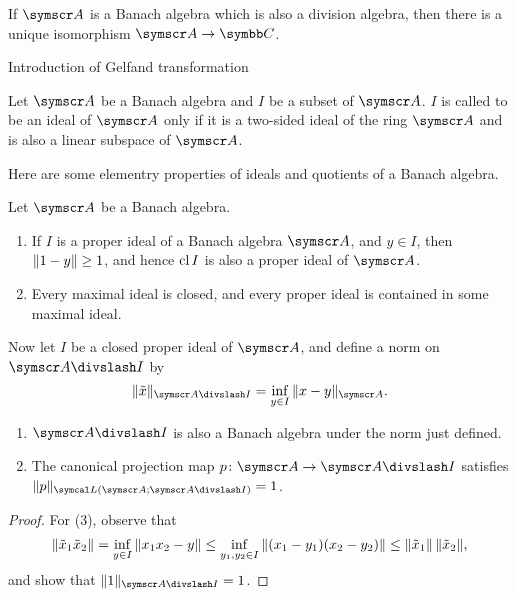 \begin{theorem}
  If $\BA A$ is a Banach algebra which is also a division algebra, then there is a unique isomorphism $\BA A\to \CC$.
\end{theorem}

Introduction of Gelfand transformation

\begin{definition}
  Let $\BA A$ be a Banach algebra and $I$ be a subset of $\BA A$. $I$ is called to be an ideal of $\BA A$ only if it is a two-sided ideal of the ring $\BA A$ and is also a linear subspace of $\BA A$.
\end{definition}

Here are some elementry properties of ideals and quotients of a Banach algebra.

\begin{proposition}
  Let $\BA A$ be a Banach algebra.
  \begin{enumerate}
    \item If $I$ is a proper ideal of a Banach algebra $\BA A$, and $y\in I$, then $\Vert1-y\Vert\geq 1$, and hence $\operatorname{cl} I$ is also a proper ideal of $\BA A$.
    \item Every maximal ideal is closed, and every proper ideal is contained in some maximal ideal.
  \end{enumerate}

  Now let $I$ be a closed proper ideal of $\BA A$, and define a norm on $\BA A\DIV I$ by
  \begin{equation*}
    \NORM{\tilde x}_{\BA A\DIV I}=\inf_{y\in I}\NORM{x-y}_{\BA A}.
  \end{equation*}
  \begin{enumerate}[resume*]
    \item $\BA A\DIV I$ is also a Banach algebra under the norm just defined.
    \item The canonical projection map $p\colon\BA A\to \BA A\DIV I$ satisfies $\NORM{p}_{\symcal L(\BA A; \BA A\DIV I)}=1$.
  \end{enumerate}
\end{proposition}

\begin{proof}
  For (3), observe that
  \begin{equation*}
    \Vert\tilde x_1\tilde x_2\Vert=\inf_{y\in I}\Vert x_1x_2-y\Vert\leq\inf_{y_1, y_2\in I}\Vert(x_1-y_1)(x_2-y_2)\Vert\leq \Vert\tilde x_1\Vert\,\Vert\tilde x_2\Vert,
  \end{equation*}
  and show that $\NORM{1}_{\BA A\DIV I}=1$.
\end{proof}


